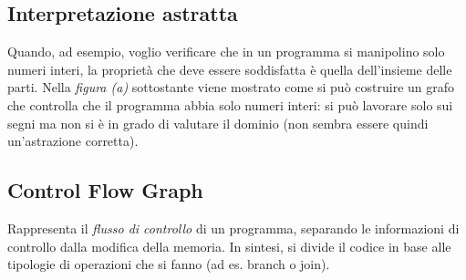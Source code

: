 \documentclass[a4paper,oneside,titlepage]{book}
\begin{document}
\subsection{Interpretazione astratta}
Quando, ad esempio, voglio verificare che in un programma si manipolino solo numeri interi, la proprietà che deve essere soddisfatta è quella dell'insieme delle parti. Nella \textit{figura (a)} sottostante viene mostrato come si può costruire un grafo che controlla che il programma abbia solo numeri interi: si può lavorare solo sui segni ma non si è in grado di valutare il dominio (non sembra essere quindi un'astrazione corretta).

\subsection{Control Flow Graph}
Rappresenta il \textit{flusso di controllo} di un programma, separando le informazioni di controllo dalla modifica della memoria. In sintesi, si divide il codice in base alle tipologie di operazioni che si fanno (ad es. branch o join).
\end{document}
